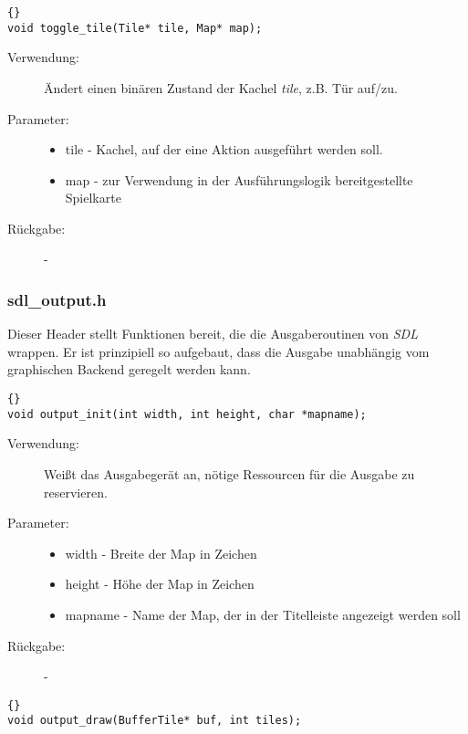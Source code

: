 \documentclass[11pt,a4paper,notitlepage]{report}
\begin{document}
		\begin{lstlisting}[caption=toggle\_tile]{}
void toggle_tile(Tile* tile, Map* map);
		\end{lstlisting}
		
	\begin{description}
		\item[Verwendung:] Ändert einen binären Zustand der Kachel \textit{tile}, z.B. Tür auf/zu.
		\item[Parameter:] \hfill
		\begin{itemize}
			\item tile - Kachel, auf der eine Aktion ausgeführt werden soll.
			\item map - zur Verwendung in der Ausführungslogik bereitgestellte Spielkarte
		\end{itemize}
		\item[Rückgabe:] -
	\end{description}

	\newpage
	\subsubsection*{sdl\_output.h}
	Dieser Header stellt Funktionen bereit, die die Ausgaberoutinen von \textit{SDL} wrappen. Er ist prinzipiell so aufgebaut, dass die Ausgabe unabhängig vom graphischen Backend geregelt werden kann.
	
		\begin{lstlisting}[caption=output\_init]{}
void output_init(int width, int height, char *mapname);
		\end{lstlisting}
		
	\begin{description}
		\item[Verwendung:] Weißt das Ausgabegerät an, nötige Ressourcen für die Ausgabe zu reservieren.
		\item[Parameter:] \hfill
		\begin{itemize}
			\item width - Breite der Map in Zeichen
			\item height - Höhe der Map in Zeichen
			\item mapname - Name der Map, der in der Titelleiste angezeigt werden soll
		\end{itemize}
		\item[Rückgabe:] -
	\end{description}
	
		\begin{lstlisting}[caption=output\_draw]{}
void output_draw(BufferTile* buf, int tiles);
		\end{lstlisting}
		
\end{document}
